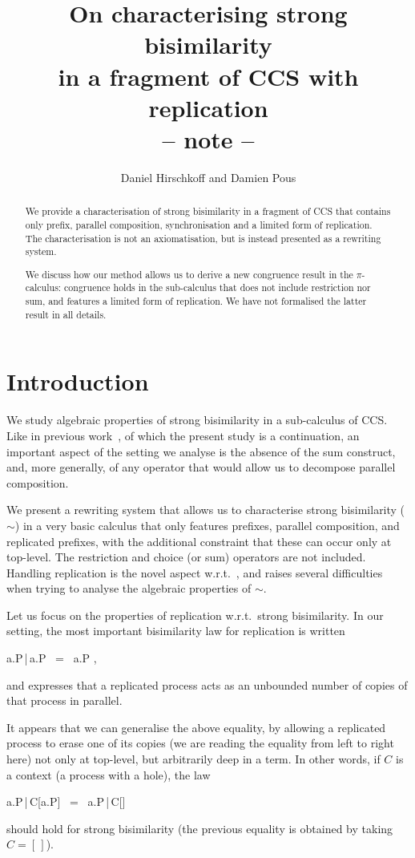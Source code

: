 \documentclass{llncs}
\title{On characterising strong bisimilarity\\
  in a fragment of CCS with replication\\
  -- note --}
\date{}
\author{Daniel Hirschkoff\inst{1} and Damien Pous\inst{2}}
\institute{ENS Lyon, Universit\'e de Lyon, CNRS, INRIA \and SARDES,
  LIG, Grenoble, CNRS, INRIA}
\begin{document}
\maketitle

\begin{abstract}
  We provide a characterisation of strong bisimilarity in a fragment
  of CCS that contains only prefix, parallel composition,
  synchronisation and a limited form of replication. The
  characterisation is not an axiomatisation, but is instead presented
  as a rewriting system.

  We discuss how our method allows us to derive a new congruence
  result in the $\pi$-calculus: congruence holds in the sub-calculus
  that does not include restriction nor sum, and features a limited
  form of replication. We have not formalised the latter result in all
  details.
\end{abstract}

\section{Introduction}

We study algebraic properties of strong bisimilarity in a sub-calculus
of CCS. Like in previous work~\cite{hirschkoff:pous:lmcs:08}, of which
the present study is a continuation, an important aspect of the
setting we analyse is the absence of the sum construct, and, more
generally, of any operator that would allow us to decompose parallel
composition.


We present a rewriting system that allows us to characterise 
strong bisimilarity ($\sim$) in a very basic calculus that only
features prefixes, parallel composition, and replicated prefixes, with
the additional constraint that these can occur only at top-level. The
restriction and choice (or sum) operators are not included.  Handling
replication is the novel aspect w.r.t.\
\cite{hirschkoff:pous:lmcs:08}, and raises several difficulties when
trying to analyse the algebraic properties of $\sim$.

Let us focus on the properties of replication w.r.t.\ strong
bisimilarity. In our setting, the most important bisimilarity law for
replication is written
\begin{mathpar}
  \!a.P\,|\,a.P ~=~ \!a.P
  \enspace,
\end{mathpar}
\noindent and expresses that a replicated process acts as an
unbounded number of copies of that process in parallel.

It appears that we can generalise the above equality, by allowing a
replicated process to erase one of its copies (we are reading the
equality from left to right here) not only at top-level, but
arbitrarily deep in a term. In other words, if $C$ is a context (a
process with a hole), the law
\begin{mathpar}
  \!a.P\,|\,C[a.P] ~=~ \!a.P\,|\,C[\nil]
\end{mathpar}
\noindent should hold for strong bisimilarity (the previous equality is
obtained by taking $C=[\,]$).
\end{document}

